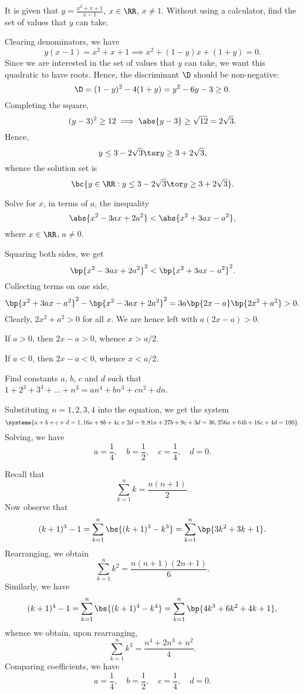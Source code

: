 \begin{problem}
    It is given that $y = \frac{x^2 + x + 1}{x - 1}$, $x \in \RR$, $x \neq 1$. Without using a calculator, find the set of values that $y$ can take.
\end{problem}
\begin{solution}
    Clearing denominators, we have \[y(x-1) = x^2 + x + 1 \implies x^2 + (1-y)x + (1+y) = 0.\] Since we are interested in the set of values that $y$ can take, we want this quadratic to have roots. Hence, the discriminant $\D$ should be non-negative: \[\D = (1-y)^2 - 4(1 + y) = y^2 - 6y - 3 \geq 0.\] Completing the square, \[(y-3)^2 \geq 12 \implies \abs{y - 3} \geq \sqrt{12} = 2\sqrt3.\] Hence, \[y \leq 3 - 2\sqrt3 \tor y \geq 3 + 2\sqrt3,\] whence the solution set is \[\bc{y \in \RR: y \leq 3 - 2\sqrt3 \tor y \geq 3 + 2\sqrt3}.\]
\end{solution}

\begin{problem}[\chili]
    Solve for $x$, in terms of $a$, the inequality \[\abs{x^2 - 3ax + 2a^2} < \abs{x^2 + 3ax - a^2},\] where $x \in \RR$, $a \neq 0$.
\end{problem}
\begin{solution}
    Squaring both sides, we get \[\bp{x^2 - 3ax + 2a^2}^2 < \bp{x^2 + 3ax - a^2}^2.\] Collecting terms on one side, \[\bp{x^2 + 3ax - a^2}^2 - \bp{x^2 - 3ax + 2a^2}^2 = 3a\bp{2x - a}\bp{2x^2 + a^2} > 0.\] Clearly, $2x^2 + a^2 > 0$ for all $x$. We are hence left with $a(2x - a) > 0$.

     If $a > 0$, then $2x - a > 0$, whence $x > a/2$.

     If $a < 0$, then $2x - a < 0$, whence $x < a/2$.
\end{solution}

\begin{problem}[\chili]
    Find constants $a$, $b$, $c$ and $d$ such that $1 + 2^3 + 3^3 + \dots + n^3 = an^4 + bn^3 + cn^2 + dn$.
\end{problem}
\begin{solution}[1]
    Substituting $n = 1, 2, 3, 4$ into the equation, we get the system \[\systeme{a + b + c + d = 1, 16a + 8b + 4c + 2d = 9, 81a + 27b + 9c + 3d = 36, 256a + 64b + 16c + 4d = 100}.\] Solving, we have \[a = \frac14, \quad b = \frac12, \quad c = \frac14, \quad d = 0.\]
\end{solution}
\begin{solution}[2]
    Recall that \[\sum_{k = 1}^n k = \frac{n(n+1)}{2}.\] Now observe that \[(k+1)^3 - 1 = \sum_{k = 1}^n \bs{(k+1)^3 - k^3} = \sum_{k = 1}^n \bp{3k^2 + 3k + 1}.\] Rearranging, we obtain \[\sum_{k = 1}^n k^2 = \frac{n(n+1)(2n+1)}6.\] Similarly, we have \[(k+1)^4 - 1 = \sum_{k = 1}^n \bs{(k+1)^4 - k^4} = \sum_{k = 1}^n \bp{4k^3 + 6k^2 + 4k + 1},\] whence we obtain, upon rearranging, \[\sum_{k = 1}^n k^3 = \frac{n^4 + 2n^3 + n^2}{4}.\] Comparing coefficients, we have \[a = \frac14, \quad b = \frac12, \quad c = \frac14, \quad d = 0.\]
\end{solution}

